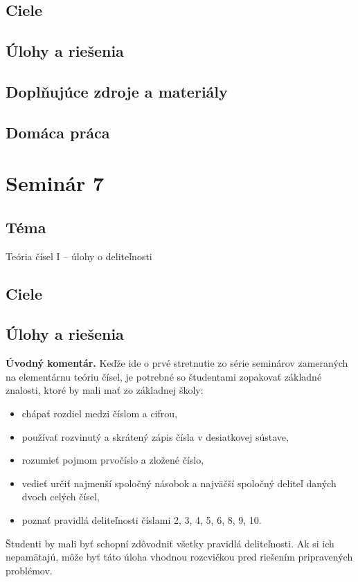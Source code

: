 \documentclass[11pt,a4paper,oneside,final]{book}
\begin{document}
\subsection*{Ciele}
\subsection*{Úlohy a riešenia}
\subsection*{Doplňujúce zdroje a materiály}
\subsection*{Domáca práca}


\newpage
\section*{Seminár 7}
\subsection*{Téma}
Teória čísel I -- úlohy o deliteľnosti
\subsection*{Ciele}


\subsection*{Úlohy a riešenia}
\textbf{Úvodný komentár.} Keďže ide o prvé stretnutie zo série seminárov zameraných na elementárnu teóriu čísel, je potrebné so študentami zopakovať základné znalosti, ktoré by mali mať zo základnej školy:
\begin{itemize}
\item chápať rozdiel medzi číslom a cifrou,
\item používať rozvinutý a skrátený zápis čísla v desiatkovej sústave,
\item rozumieť pojmom prvočíslo a zložené číslo,
\item vedieť určiť najmenší spoločný násobok a najväčší spoločný deliteľ daných dvoch celých čísel,
\item poznať pravidlá deliteľnosti číslami 2, 3, 4, 5, 6, 8, 9, 10.
\end{itemize}
Študenti by mali byť schopní zdôvodniť všetky pravidlá deliteľnosti. Ak si ich nepamätajú, môže byť táto úloha vhodnou rozcvičkou pred riešením pripravených problémov.
\end{document}

